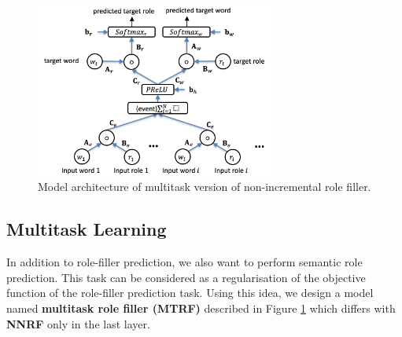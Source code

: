 \documentclass[a4paper]{article}
\begin{document}
\begin{figure}[t]
\centering
\includegraphics[width=0.7\textwidth]{MTRF.png}
\caption{\label{fig:MTNNRF} Model architecture of multitask version of non-incremental role filler.}
\end{figure}


\subsection{Multitask Learning} \label{sec:mtl}
In addition to role-filler prediction, we also want to perform semantic role prediction. This task can be considered as a regularisation of the objective function of the role-filler prediction task. Using this idea, we design a model named \textbf{multitask role filler (MTRF)} described in Figure \ref{fig:MTNNRF} which differs with \textbf{NNRF} only in the last layer. 
\end{document}
